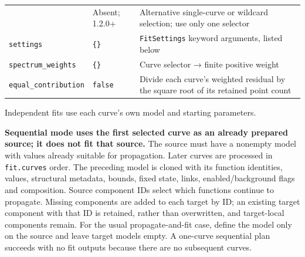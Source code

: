 \documentclass[
  10pt,
  a4paper,
  oneside]{scrreprt}
\begin{document}
\begin{longtable}[]{@{}lll@{}}
\begin{minipage}[t]{0.30\columnwidth}
\end{minipage} & \begin{minipage}[t]{0.30\columnwidth}\raggedright
Absent; 1.2.0+\strut
\end{minipage} & \begin{minipage}[t]{0.30\columnwidth}\raggedright
Alternative single-curve or wildcard selection; use only one
selector\strut
\end{minipage}\tabularnewline
\begin{minipage}[t]{0.30\columnwidth}\raggedright
\texttt{settings}\strut
\end{minipage} & \begin{minipage}[t]{0.30\columnwidth}\raggedright
\texttt{\{\}}\strut
\end{minipage} & \begin{minipage}[t]{0.30\columnwidth}\raggedright
\texttt{FitSettings} keyword arguments, listed below\strut
\end{minipage}\tabularnewline
\begin{minipage}[t]{0.30\columnwidth}\raggedright
\texttt{spectrum\_weights}\strut
\end{minipage} & \begin{minipage}[t]{0.30\columnwidth}\raggedright
\texttt{\{\}}\strut
\end{minipage} & \begin{minipage}[t]{0.30\columnwidth}\raggedright
Curve selector → finite positive weight\strut
\end{minipage}\tabularnewline
\begin{minipage}[t]{0.30\columnwidth}\raggedright
\texttt{equal\_contribution}\strut
\end{minipage} & \begin{minipage}[t]{0.30\columnwidth}\raggedright
\texttt{false}\strut
\end{minipage} & \begin{minipage}[t]{0.30\columnwidth}\raggedright
Divide each curve's weighted residual by the square root of its retained
point count\strut
\end{minipage}\tabularnewline
\bottomrule
\end{longtable}

Independent fits use each curve's own model and starting parameters.

\textbf{Sequential mode uses the first selected curve as an already
prepared source; it does not fit that source.} The source must have a
nonempty model with values already suitable for propagation. Later
curves are processed in \texttt{fit.curves} order. The preceding model
is cloned with its function identities, values, structural metadata,
bounds, fixed state, links, enabled/background flags and composition.
Source component IDs select which functions continue to propagate.
Missing components are added to each target by ID; an existing target
component with that ID is retained, rather than overwritten, and
target-local components remain. For the usual propagate-and-fit case,
define the model only on the source and leave target models empty. A
one-curve sequential plan succeeds with no fit outputs because there are
no subsequent curves.
\end{document}
